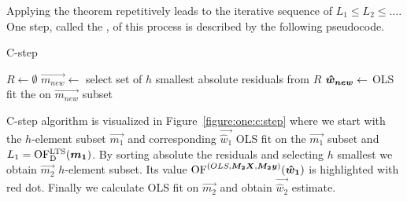 Applying the theorem repetitively leads to the iterative sequence of
$L_{1} \leq L_{2} \leq \ldots$. One step, called the , of this process is described by the following pseudocode.

\begin{algorithm}[H]
    \label{alg:Cstep}
    \caption{C-step}
    $R \gets \emptyset$\;
    $\vec{m_{new}} \gets $ select set of $h$ smallest absolute residuals from $R$\;
    $\boldsymbol{\hat{w}_{new}} \gets$ OLS fit the on $\vec{m_{new}}$ subset\;
    \;
\end{algorithm}

C-step algorithm is visualized in Figure~\ref{figure:one:c:step} where we start with the $h$-element subset $\vec{m_1}$ and corresponding $\vec{\hat{w}_1}$ OLS fit on the $\vec{m_1}$ subset and $L_1 = \operatorname{OF^{LTS}_D}(\boldsymbol{m_1})$. By sorting absolute the residuals and selecting $h$ smallest we obtain $\vec{m_2}$ $h$-element subset. Its value $\operatorname{OF}^{(OLS,\boldsymbol{M_2}\boldsymbol{X},  \boldsymbol{M_2}\boldsymbol{y})} (\boldsymbol{\hat{w}_1})$ is highlighted with red dot. Finally we calculate OLS fit on $\vec{m_2}$ and obtain $\vec{\hat{w}_2}$ estimate. 



